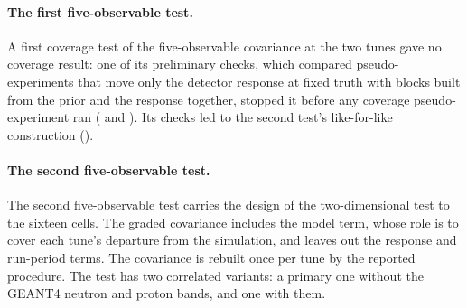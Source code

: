 \paragraph{The first five-observable test.} A first coverage test of the five-observable covariance at the two tunes gave no coverage result: one of its preliminary checks, which compared pseudo-experiments that move only the detector response at fixed truth with blocks built from the prior and the response together, stopped it before any coverage pseudo-experiment ran ( and ). Its checks led to the second test's like-for-like construction ().

\paragraph{The second five-observable test.}

The second five-observable test carries the design of the two-dimensional test to the sixteen cells. The graded covariance includes the model term, whose role is to cover each tune's departure from the simulation, and leaves out the response and run-period terms. The covariance is rebuilt once per tune by the reported procedure. The test has two correlated variants: a primary one without the GEANT4 neutron and proton bands, and one with them.

